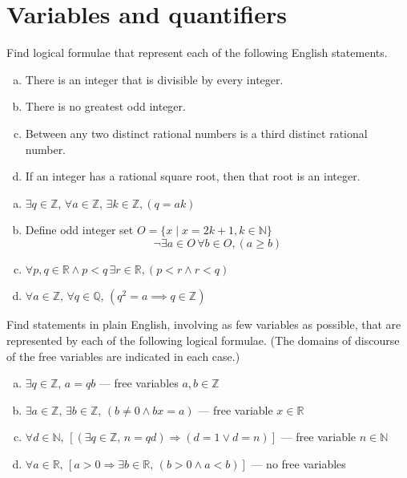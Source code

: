 \section{Variables and quantifiers}


\begin{exercise}
\label{exEnglishToLogicalFormulae}
Find logical formulae that represent each of the following English statements.
\begin{enumerate}[(a)]
\item There is an integer that is divisible by every integer.
\item There is no greatest odd integer.
\item Between any two distinct rational numbers is a third distinct rational number.
\item If an integer has a rational square root, then that root is an integer.
\end{enumerate}
\end{exercise}

\begin{solutions*}
    \fixlistskip
    \begin{enumerate}[(a)]
\item $\exists q \in \mathbb{Z},\, \forall a \in \mathbb{Z},\, \exists k \in \mathbb{Z}, (q = ak)$
\item Define odd integer set $O=\{x \mid x=2k+1, k \in \mathbb{N}\}$
\[\neg \exists a \in O\, \forall b \in O, (a \ge b)\]
\item $\forall p,q \in \mathbb{R} \wedge p < q\, \exists r \in \mathbb{R}, (p < r \wedge r < q)$
\item $\forall a \in \mathbb{Z},\, \forall q \in \mathbb{Q},\, (q^2=a \implies q \in \mathbb{Z})$
\end{enumerate}
\end{solutions*}

\begin{exercise}
\label{exLogicalFormulaeToEnglish}
Find statements in plain English, involving as few variables as possible, that are represented by each of the following logical formulae. (The domains of discourse of the free variables are indicated in each case.)
\begin{enumerate}[(a)]
\item $\exists q \in \mathbb{Z},\, a = qb$ --- free variables $a, b \in \mathbb{Z}$
\item $\exists a \in \mathbb{Z},\, \exists b \in \mathbb{Z},\, (b \ne 0 \wedge bx = a)$ --- free variable $x \in \mathbb{R}$
\item $\forall d \in \mathbb{N},\, [(\exists q \in \mathbb{Z},\, n=qd) \Rightarrow (d = 1 \vee d = n)]$ --- free variable $n \in \mathbb{N}$
\item $\forall a \in \mathbb{R},\, [a > 0 \Rightarrow \exists b \in \mathbb{R},\, (b > 0 \wedge a < b)]$ --- no free variables
\end{enumerate}
\end{exercise}

